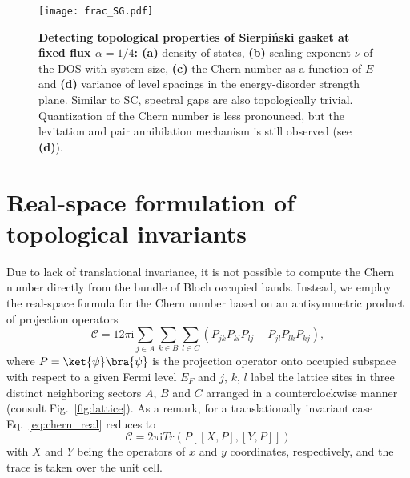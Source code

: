 {\begin{figure}[h]
\centering
\texttt{[image: frac\_SG.pdf]} 
\caption{\textbf{Detecting topological properties of Sierpiński gasket at fixed flux $\alpha = 1/4$: (a)} density of states, \textbf{(b)} scaling exponent $\nu$ of the DOS with system size, \textbf{(c)} the Chern number as a function of $E$ and \textbf{(d)} variance of level spacings in the energy-disorder strength plane. Similar to SC, spectral gaps are also topologically trivial. Quantization of the Chern number is less pronounced, but the levitation and pair annihilation mechanism is still observed (see \textbf{(d)}).}
\label{fig:frac_SG}
\end{figure}

\section{Real-space formulation of topological invariants}

Due to lack of translational invariance, it is not possible to compute the Chern number directly from the bundle of Bloch occupied bands. Instead, we employ the real-space formula for the Chern number based on an antisymmetric product of projection operators~\cite{KITAEV20062}
\begin{equation}
\mathcal{C} = 12 \pi \mathrm{i} \sum_{j \in A} \sum_{k \in B} \sum_{l \in C} \left( P_{jk} P_{kl} P_{lj} - P_{jl} P_{lk} P_{kj} \right),
\label{eq:chern_real}
\end{equation}
where $P =  \ket{\psi} \bra{\psi}$ is the projection operator onto occupied subspace with respect to a given Fermi level $E_F$ and $j, \, k, \, l$ label the lattice sites in three distinct neighboring sectors $A$, $B$ and $C$ arranged in a counterclockwise manner (consult Fig.~\ref{fig:lattice}). As a remark, for a translationally invariant case Eq.~\ref{eq:chern_real} reduces to
\begin{equation}
\mathcal{C} = 2 \pi \mathrm{i} Tr \left( P \left[ [X, P], [Y, P] \right] \right)
\label{eq:chern_real_translational}
\end{equation}
with $X$ and $Y$ being the operators of $x$ and $y$ coordinates, respectively, and the trace is taken over the unit cell.

}
